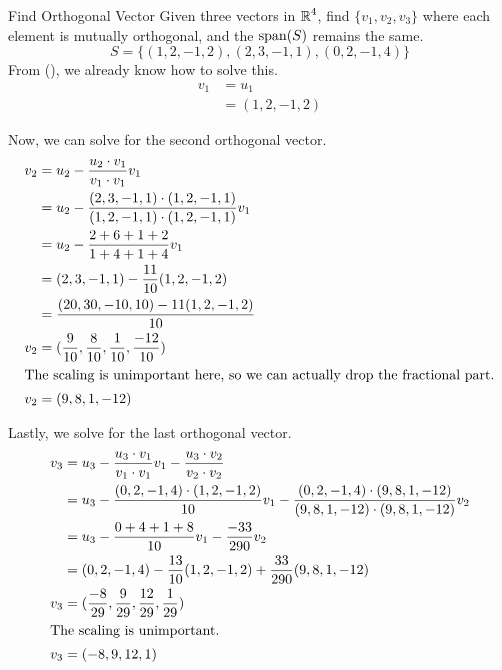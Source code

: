 \begin{example}{Find Orthogonal Vector}
  Given three vectors in $\operatorname{\mathbb{R}}^{4}$, find $\lbrace v_{1}, v_{2}, v_{3} \rbrace$ where each element is mutually orthogonal, and the  $\operatorname{span}(S)$ remains the same.
  \begin{equation*}
    S = \lbrace (1, 2, -1, 2), (2, 3, -1, 1), (0, 2, -1, 4) \rbrace
  \end{equation*}
  \tcblower{}
  From  (), we already know how to solve this.
  \begin{align*}
    v_{1} &= u_{1} \\
          &= (1, 2, -1, 2)
  \end{align*}

  Now, we can solve for the second orthogonal vector.
  \begin{align*}
    v_{2} &= u_{2} - \frac{u_{2} \cdot v_{1}}{v_{1} \cdot v_{1}} v_{1} \\
          &= u_{2} - \frac{(2, 3, -1, 1) \cdot (1, 2, -1, 1)}{(1, 2, -1, 1) \cdot (1, 2, -1, 1)} v_{1} \\
          &= u_{2} - \frac{2 + 6 + 1 + 2}{1 + 4 + 1 + 4} v_{1} \\
          &= (2, 3, -1, 1) - \frac{11}{10} (1, 2, -1, 2) \\
          &= \frac{(20, 30, -10, 10) - 11 (1, 2, -1, 2)}{10} \\
    v_{2} &= (\frac{9}{10}, \frac{8}{10}, \frac{1}{10}, \frac{-12}{10}) \\
    \intertext{The scaling is unimportant here, so we can actually drop the fractional part.}
    v_{2} &= (9, 8, 1, -12)
  \end{align*}

  Lastly, we solve for the last orthogonal vector.
  \begin{align*}
    v_{3} &= u_{3} - \frac{u_{3} \cdot v_{1}}{v_{1} \cdot v_{1}} v_{1} - \frac{u_{3} \cdot v_{2}}{v_{2} \cdot v_{2}} \\
          &= u_{3} - \frac{(0, 2, -1, 4) \cdot (1, 2, -1, 2)}{10} v_{1} - \frac{(0, 2, -1, 4) \cdot (9, 8, 1, -12)}{(9,8,1,-12) \cdot (9,8,1,-12)} v_{2} \\
          &= u_{3} - \frac{0+4+1+8}{10} v_{1} - \frac{-33}{290} v_{2} \\
          &= (0, 2, -1, 4) - \frac{13}{10}(1,2,-1,2) + \frac{33}{290} (9, 8, 1, -12) \\
    v_{3} &= (\frac{-8}{29}, \frac{9}{29}, \frac{12}{29}, \frac{1}{29}) \\
    \intertext{The scaling is unimportant.}
    v_{3} &= (-8, 9, 12, 1)
  \end{align*}
\end{example}


